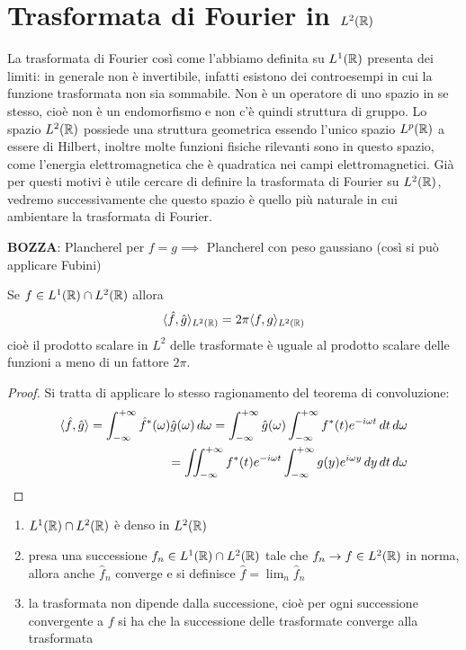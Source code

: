 \section{
  \texorpdfstring
  {Trasformata di Fourier in $ L^2(\R) $}
  {Trasformata di Fourier in L²(R)}
}
La trasformata di Fourier così come l'abbiamo definita su $ L^1(\R) $ presenta dei limiti: in generale non è invertibile, 
infatti esistono dei controesempi in cui la funzione trasformata non sia sommabile. Non è un operatore di uno spazio in se stesso, cioè non è un 
endomorfismo e non c'è quindi struttura di gruppo. Lo spazio $ L^2(\R) $ possiede una struttura geometrica essendo l'unico spazio $ L^p(\R) $ a 
essere di Hilbert, inoltre molte funzioni fisiche rilevanti sono in questo spazio, come l'energia elettromagnetica che è quadratica nei campi 
elettromagnetici. Già per questi motivi è utile cercare di definire la trasformata di Fourier su $ L^2(\R) $, vedremo successivamente che questo spazio 
è quello più naturale in cui ambientare la trasformata di Fourier.

\textbf{BOZZA}: Plancherel per $f = g  \implies $ Plancherel con peso gaussiano (così si può applicare Fubini)
\begin{lemma}[ di Plancherel ]
  Se $ f \in L^1(\R) \cap L^2(\R) $ allora 
  \begin{align}
    \sc{\hat{f}, \hat{g}}_{L^2(\R)} = 2\pi \sc{f,g}_{L^2(\R)}
  \end{align}
  cioè il prodotto scalare in $ L^2 $ delle trasformate è uguale al prodotto scalare delle funzioni a meno di un fattore $ 2\pi $.
\end{lemma}
\begin{proof}
  Si tratta di applicare lo stesso ragionamento del teorema di convoluzione:
  \begin{align}
    \sc{\hat{f}, \hat{g}} = \int_{-\infty}^{+\infty} \hat{f}^*(\omega) \hat{g}(\omega) \, d\omega 
    = \int_{-\infty}^{+\infty} \hat{g}(\omega) \int_{-\infty}^{+\infty} {f}^*(t)e^{-i\omega t} \,dt \, d\omega 
    \\=  \iint_{-\infty}^{+\infty} {f}^*(t)e^{-i\omega t} \int_{-\infty}^{+\infty} g(y)e^{i\omega y} \, dy \,dt \, d\omega
  \end{align}
\end{proof}

\begin{enumerate}
  \item $ L^1(\R) \cap L^2(\R) $ è denso in $ L^2(\R) $
  \item presa una successione $ f_n \in L^1(\R) \cap L^2(\R) $ tale che $ f_n \to f \in L^2(\R) $ in norma, allora anche $ \hat{f}_n $ converge e si 
  definisce $ \hat{f} = \lim_n \hat{f}_n $
  \item la trasformata non dipende dalla successione, cioè per ogni successione convergente a $ f $ si ha che la successione delle trasformate converge 
  alla trasformata
\end{enumerate}

